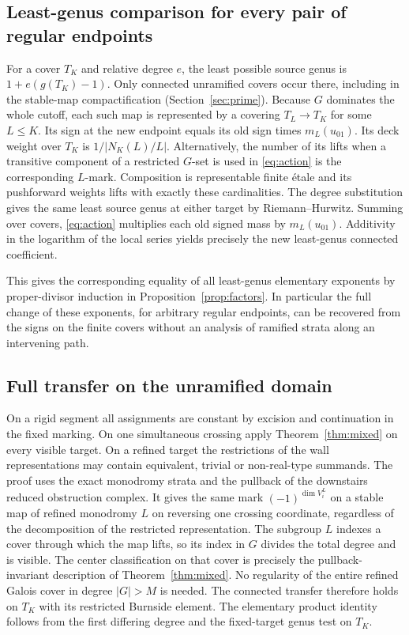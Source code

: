 \subsection{Least-genus comparison for every pair of regular endpoints}

For a cover \(T_K\) and relative degree \(e\), the least possible source genus is \(1+e(g(T_K)-1)\). Only connected unramified covers occur there, including in the stable-map compactification (Section~\ref{sec:prime}). Because \(G\) dominates the whole cutoff, each such map is represented by a covering \(T_L\to T_K\) for some \(L\le K\). Its sign at the new endpoint equals its old sign times \(m_L(u_{01})\). Its deck weight over \(T_K\) is \(1/|N_K(L)/L|\). Alternatively, the number of its lifts when a transitive component of a restricted \(G\)-set is used in \eqref{eq:action} is the corresponding \(L\)-mark. Composition is representable finite étale and its pushforward weights lifts with exactly these cardinalities. The degree substitution gives the same least source genus at either target by Riemann--Hurwitz. Summing over covers, \eqref{eq:action} multiplies each old signed mass by \(m_L(u_{01})\). Additivity in the logarithm of the local series yields precisely the new least-genus connected coefficient.

This gives the corresponding equality of all least-genus elementary exponents by proper-divisor induction in Proposition~\ref{prop:factors}. In particular the full change of these exponents, for arbitrary regular endpoints, can be recovered from the signs on the finite covers without an analysis of ramified strata along an intervening path.

\subsection{Full transfer on the unramified domain}

On a rigid segment all assignments are constant by excision and continuation in the fixed marking. On one simultaneous crossing apply Theorem~\ref{thm:mixed} on every visible target. On a refined target the restrictions of the wall representations may contain equivalent, trivial or non-real-type summands. The proof uses the exact monodromy strata and the pullback of the downstairs reduced obstruction complex. It gives the same mark \((-1)^{\dim V_i^L}\) on a stable map of refined monodromy \(L\) on reversing one crossing coordinate, regardless of the decomposition of the restricted representation. The subgroup \(L\) indexes a cover through which the map lifts, so its index in \(G\) divides the total degree and is visible. The center classification on that cover is precisely the pullback-invariant description of Theorem~\ref{thm:mixed}. No regularity of the entire refined Galois cover in degree \(|G|>M\) is needed. The connected transfer therefore holds on \(T_K\) with its restricted Burnside element. The elementary product identity follows from the first differing degree and the fixed-target genus test on \(T_K\).


